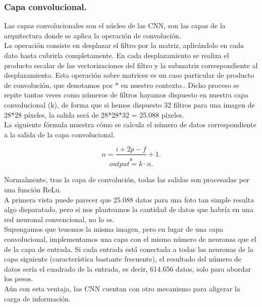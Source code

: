 \documentclass[a4paper,11pt]{article}
\begin{document}
\subsubsection{Capa convolucional.}
Las capas convolucionales son el núcleo de las CNN, son las capas de la arquitectura donde se aplica la operación de convolución. \\

\noindent
La operación consiste en desplazar el filtro por la matriz, aplicándolo en cada dato hasta cubrirla completamente. En cada desplazamiento se realiza el producto escalar de las vectorizaciones del filtro y la submatriz correspondiente al desplazamiento. Esta operación sobre matrices es un caso particular de producto de convolución, que denotamos por $*$ en nuestro contexto.. Dicho proceso se repite tantas veces como números de filtros hayamos dispuesto en nuestra capa convolucional (k), de forma que si hemos dispuesto 32 filtros para una imagen de 28*28 píxeles, la salida será de 28*28*32 = 25.088 píxeles.\\

\noindent
La siguiente fórmula muestra cómo se calcula el número de datos correspondiente a la salida de la capa convolucional.

\begin{equation}
n=\frac{i+2p-f}{s}  +1.
\end{equation}
\begin{equation}
output = k \cdot n.
\end{equation}

Normalmente, tras la capa de convolución, todas las salidas son procesadas por una función ReLu.\\

\noindent
A primera vista puede parecer que 25.088 datos para una foto tan simple resulta algo disparatado, pero si nos planteamos la cantidad de datos que habría en una red neuronal convencional, no lo es. \\

\noindent
Supongamos que tenemos la misma imagen, pero en lugar de una capa convolucional, implementamos una capa con el mismo número de neuronas que el de la capa de entrada. Si cada entrada está conectada a todas las neuronas de la capa siguiente (característica bastante frecuente), el resultado del número de datos sería el cuadrado de la entrada, es decir, 614.656 datos, solo para abordar los pesos. \\

\noindent
Aún con esta ventaja, las CNN cuentan con otro mecanismo para aligerar la carga de información.
\end{document}
